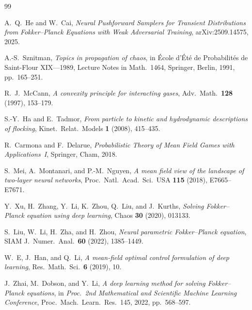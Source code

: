 \documentclass[12pt]{article}
\theoremstyle{plain}
\begin{document}
\begin{thebibliography}{99}

A.~Q.\ He and W.~Cai,
\textit{Neural Pushforward Samplers for Transient Distributions from
Fokker--Planck Equations with Weak Adversarial Training},
arXiv:2509.14575, 2025.

A.-S.\ Sznitman,
\textit{Topics in propagation of chaos},
in \'{E}cole d'\'{E}t\'{e} de Probabilit\'{e}s de Saint-Flour XIX---1989,
Lecture Notes in Math.\ 1464, Springer, Berlin, 1991, pp.\ 165--251.

R.~J.\ McCann,
\textit{A convexity principle for interacting gases},
Adv.\ Math.\ \textbf{128} (1997), 153--179.

S.-Y.\ Ha and E.~Tadmor,
\textit{From particle to kinetic and hydrodynamic descriptions of flocking},
Kinet.\ Relat.\ Models \textbf{1} (2008), 415--435.

R.~Carmona and F.~Delarue,
\textit{Probabilistic Theory of Mean Field Games with Applications~I},
Springer, Cham, 2018.

S.~Mei, A.~Montanari, and P.-M.\ Nguyen,
\textit{A mean field view of the landscape of two-layer neural networks},
Proc.\ Natl.\ Acad.\ Sci.\ USA \textbf{115} (2018), E7665--E7671.

Y.~Xu, H.~Zhang, Y.~Li, K.~Zhou, Q.~Liu, and J.~Kurths,
\textit{Solving Fokker--Planck equation using deep learning},
Chaos \textbf{30} (2020), 013133.

S.~Liu, W.~Li, H.~Zha, and H.~Zhou,
\textit{Neural parametric Fokker--Planck equation},
SIAM J.\ Numer.\ Anal.\ \textbf{60} (2022), 1385--1449.

W.~E, J.~Han, and Q.~Li,
\textit{A mean-field optimal control formulation of deep learning},
Res.\ Math.\ Sci.\ \textbf{6} (2019), 10.

J.~Zhai, M.~Dobson, and Y.~Li,
\textit{A deep learning method for solving Fokker--Planck equations},
in \textit{Proc.\ 2nd Mathematical and Scientific Machine Learning Conference},
Proc.\ Mach.\ Learn.\ Res.\ 145, 2022, pp.\ 568--597.

\end{thebibliography}
\end{document}
